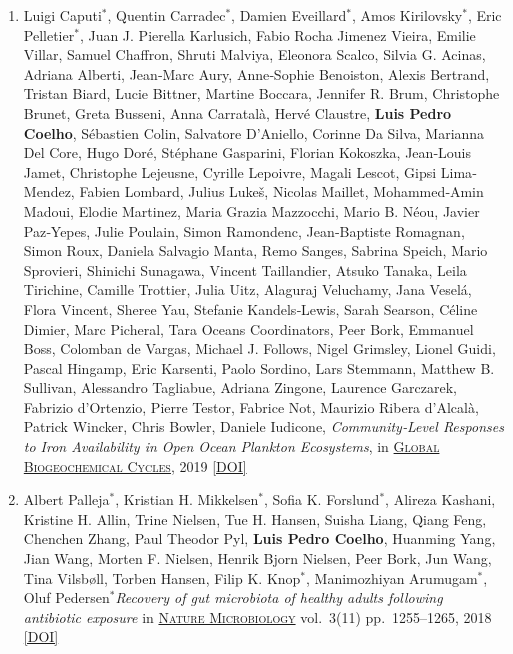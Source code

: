 \documentclass{article}
\newcommand\showdoi[1]{%
    \href{https://doi.org/#1}{[DOI]}%
}
\newcommand\pubname[1]{\textsc{\uline{#1}}}
\newcommand\contribution[1]{\relax}
\newcommand\costar{${}^{*}$}
\begin{document}
\begin{enumerate}[resume]
\item Luigi Caputi\costar, Quentin Carradec\costar, Damien Eveillard\costar,
Amos Kirilovsky\costar, Eric Pelletier\costar, Juan J. Pierella Karlusich,
Fabio Rocha Jimenez Vieira, Emilie Villar, Samuel Chaffron, Shruti Malviya,
Eleonora Scalco, Silvia G. Acinas, Adriana Alberti, Jean‐Marc Aury, Anne‐Sophie
Benoiston, Alexis Bertrand, Tristan Biard, Lucie Bittner, Martine Boccara,
Jennifer R. Brum, Christophe Brunet, Greta Busseni, Anna Carratalà, Hervé
Claustre, \textbf{Luis Pedro Coelho}, Sébastien Colin, Salvatore D'Aniello,
Corinne Da Silva, Marianna Del Core, Hugo Doré, Stéphane Gasparini, Florian
Kokoszka, Jean‐Louis Jamet, Christophe Lejeusne, Cyrille Lepoivre, Magali
Lescot, Gipsi Lima‐Mendez, Fabien Lombard, Julius Lukeš, Nicolas Maillet,
Mohammed‐Amin Madoui, Elodie Martinez, Maria Grazia Mazzocchi, Mario B. Néou,
Javier Paz‐Yepes, Julie Poulain, Simon Ramondenc, Jean‐Baptiste Romagnan, Simon
Roux, Daniela Salvagio Manta, Remo Sanges, Sabrina Speich, Mario Sprovieri,
Shinichi Sunagawa, Vincent Taillandier, Atsuko Tanaka, Leila Tirichine, Camille
Trottier, Julia Uitz, Alaguraj Veluchamy, Jana Veselá, Flora Vincent, Sheree
Yau, Stefanie Kandels‐Lewis, Sarah Searson, Céline Dimier, Marc Picheral, Tara
Oceans Coordinators, Peer Bork, Emmanuel Boss, Colomban de Vargas, Michael J.
Follows, Nigel Grimsley, Lionel Guidi, Pascal Hingamp, Eric Karsenti, Paolo
Sordino, Lars Stemmann, Matthew B. Sullivan, Alessandro Tagliabue, Adriana
Zingone, Laurence Garczarek, Fabrizio d'Ortenzio, Pierre Testor, Fabrice Not,
Maurizio Ribera d'Alcalà, Patrick Wincker, Chris Bowler, Daniele Iudicone,
\emph{Community‐Level Responses to Iron Availability in Open Ocean Plankton
Ecosystems}, in \pubname{Global Biogeochemical Cycles}, 2019
\showdoi{10.1029/2018gb006022}
\contribution{I contributed to data analysis (of metatranscriptomics and
imaging data).}

\item Albert Palleja\costar, Kristian H. Mikkelsen\costar, Sofia K.
Forslund\costar, Alireza Kashani, Kristine H. Allin, Trine Nielsen, Tue H.
Hansen, Suisha Liang, Qiang Feng, Chenchen Zhang, Paul Theodor Pyl,
\textbf{Luis Pedro Coelho}, Huanming Yang, Jian Wang, Morten F. Nielsen, Henrik
Bjorn Nielsen, Peer Bork, Jun Wang, Tina Vilsbøll, Torben Hansen, Filip K.
Knop\costar, Manimozhiyan Arumugam\costar, Oluf Pedersen\costar \emph{Recovery
of gut microbiota of healthy adults following antibiotic exposure} in
\pubname{Nature Microbiology} vol.\ 3(11) pp.\ 1255--1265, 2018
\showdoi{10.1038/s41564-018-0257-9}
\contribution{I performed statistical analyses of the microbiome data.}


\end{enumerate}
\end{document}
